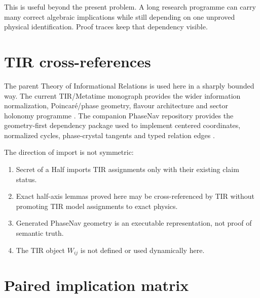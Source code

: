 This is useful beyond the present problem.  A long research programme can carry
many correct algebraic implications while still depending on one unproved
physical identification.  Proof traces keep that dependency visible.

\section{TIR cross-references}

The parent Theory of Informational Relations is used here in a sharply bounded
way.  The current TIR/Metatime monograph provides the wider information
normalization, Poincar\'e/phase geometry, flavour architecture and sector
holonomy programme \citep{lipa2026tir}.  The companion PhaseNav repository
provides the geometry-first dependency package used to implement centered
coordinates, normalized cycles, phase-crystal tangents and typed relation edges
\citep{lipa2026phasenav}.

The direction of import is not symmetric:
\begin{enumerate}
 \item Secret of a Half imports TIR assignments only with their existing claim
 status.
 \item Exact half-axis lemmas proved here may be cross-referenced by TIR without
 promoting TIR model assignments to exact physics.
 \item Generated PhaseNav geometry is an executable representation, not proof
 of semantic truth.
 \item The TIR object $W_{ij}$ is not defined or used dynamically here.
\end{enumerate}

\section{Paired implication matrix}


